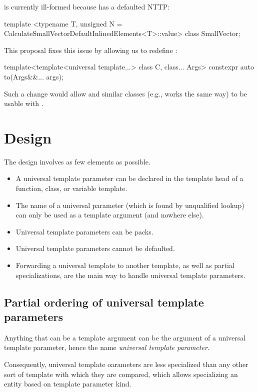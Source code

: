 \documentclass{wg21}
\begin{document}
is currently ill-formed because  has a defaulted NTTP:

\begin{colorblock}
template <typename T, unsigned N = CalculateSmallVectorDefaultInlinedElements<T>::value>
class SmallVector;
\end{colorblock}

This proposal fixes this issue by allowing us to redefine :

\begin{colorblock}
template<template<universal template...> class C, class... Args>
constexpr auto to(Args&&... args);
\end{colorblock}

Such a change would allow  and similar classes (e.g.,  works the same way) to be usable with .

\section{Design}

The design involves as few elements as possible.
\begin{itemize}
\item A universal template parameter can be declared in the template head of a function, class, or variable template.
\item The name of a universal parameter (which is found by unqualified lookup) can only be used as a template argument (and nowhere else).
\item Universal template parameters can be packs.
\item Universal template parameters cannot be defaulted.
\item Forwarding a universal template to another template, as well as partial specializations, are the main way to handle universal template parameters.
\end{itemize}

\subsection{Partial ordering of universal template parameters}

Anything that can be a template argument can be the argument of a universal template parameter, hence the name \emph{universal template parameter}.

Consequently, universal template oarameters are less specialized than any other sort of template with which they are compared,
which allows specializing an entity based on template parameter kind.
\end{document}
